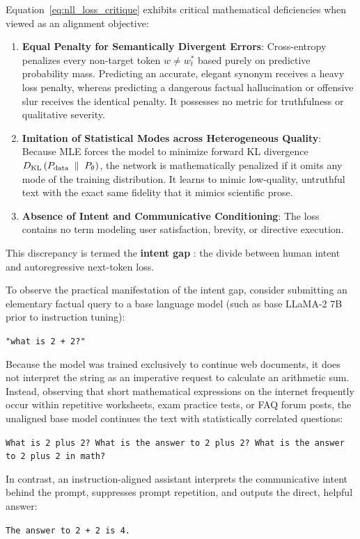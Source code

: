 \documentclass[../../main.tex]{subfiles}
\begin{document}
Equation~\eqref{eq:nll_loss_critique} exhibits critical mathematical deficiencies when viewed as an alignment objective:
\begin{enumerate}
    \item \textbf{Equal Penalty for Semantically Divergent Errors}: Cross-entropy penalizes every non-target token $w \neq w_t^*$ based purely on predictive probability mass. Predicting an accurate, elegant synonym receives a heavy loss penalty, whereas predicting a dangerous factual hallucination or offensive slur receives the identical penalty. It possesses no metric for truthfulness or qualitative severity.
    \item \textbf{Imitation of Statistical Modes across Heterogeneous Quality}: Because MLE forces the model to minimize forward KL divergence $D_{\mathrm{KL}}\left(P_{\text{data}} \;\parallel\; P_\theta\right)$, the network is mathematically penalized if it omits any mode of the training distribution. It learns to mimic low-quality, untruthful text with the exact same fidelity that it mimics scientific prose.
    \item \textbf{Absence of Intent and Communicative Conditioning}: The loss contains no term modeling user satisfaction, brevity, or directive execution.
\end{enumerate}

This discrepancy is termed the \textbf{intent gap} \citep{ouyang2022}: the divide between human intent and autoregressive next-token loss.

\begin{tcolorbox}[colback=cardBg,colframe=cardLine,arc=2pt,boxrule=0.5pt,title=\textbf{Pedagogical Example: Base Model Prompt Continuation versus Assistant Directive Execution}]
\label{box:base_model_continuation_failure}
To observe the practical manifestation of the intent gap, consider submitting an elementary factual query to a base language model (such as base LLaMA-2 7B prior to instruction tuning):
\begin{center}
\texttt{"what is 2 + 2?"}
\end{center}
Because the model was trained exclusively to continue web documents, it does not interpret the string as an imperative request to calculate an arithmetic sum. Instead, observing that short mathematical expressions on the internet frequently occur within repetitive worksheets, exam practice tests, or FAQ forum posts, the unaligned base model continues the text with statistically correlated questions:
\begin{center}
\texttt{What is 2 plus 2? What is the answer to 2 plus 2? What is the answer to 2 plus 2 in math?}
\end{center}
In contrast, an instruction-aligned assistant interprets the communicative intent behind the prompt, suppresses prompt repetition, and outputs the direct, helpful answer:
\begin{center}
\texttt{The answer to 2 + 2 is 4.}
\end{center}
\end{tcolorbox}
\end{document}

